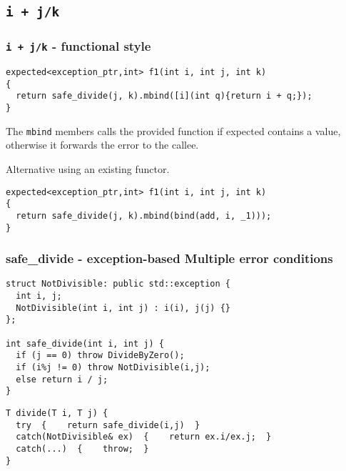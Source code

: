 \documentclass[xcolor=dvipsnames]{beamer}
\newcommand{\cpp}[1]{\lstinline{#1}}
\begin{document}
\subsection{\cpp{i + j/k}}
\begin{frame}[fragile]
\frametitle{\cpp{i + j/k}  - functional style}

\begin{lstlisting}
expected<exception_ptr,int> f1(int i, int j, int k)
{
  return safe_divide(j, k).mbind([i](int q){return i + q;});
}
\end{lstlisting}

The \cpp{mbind} members calls the provided function if expected contains a value, otherwise it forwards the error to the callee. 

Alternative using an existing functor.

\begin{lstlisting}
expected<exception_ptr,int> f1(int i, int j, int k)
{
  return safe_divide(j, k).mbind(bind(add, i, _1)));
}
\end{lstlisting}
\end{frame}
\begin{frame}[fragile]
\frametitle{safe\_divide  - exception-based Multiple error conditions}

\begin{lstlisting}
struct NotDivisible: public std::exception {
  int i, j;
  NotDivisible(int i, int j) : i(i), j(j) {}
};

int safe_divide(int i, int j) {
  if (j == 0) throw DivideByZero(); 
  if (i%j != 0) throw NotDivisible(i,j);
  else return i / j; 
}
\end{lstlisting}

\begin{lstlisting}
T divide(T i, T j) {
  try  {    return safe_divide(i,j)  }
  catch(NotDivisible& ex)  {    return ex.i/ex.j;  }
  catch(...)  {    throw;  }
}
\end{lstlisting}
\end{frame}
\end{document}
